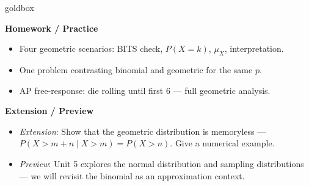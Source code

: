\documentclass[10pt]{article}
\begin{document}
\begin{skillbox}{goldbox}
\begin{minipage}[t]{0.48\linewidth}
    \textbf{Homework / Practice}
    \begin{itemize}
        \item Four geometric scenarios: BITS check, $P(X = k)$, $\mu_X$,
              interpretation.
        \item One problem contrasting binomial and geometric for the same $p$.
        \item AP free-response: die rolling until first 6 --- full geometric
              analysis.
    \end{itemize}
\end{minipage}
\hfill
\begin{minipage}[t]{0.48\linewidth}
    \textbf{Extension / Preview}
    \begin{itemize}
        \item \textit{Extension}: Show that the geometric distribution is
              memoryless --- $P(X > m+n \mid X > m) = P(X > n)$. Give a
              numerical example.
        \item \textit{Preview}: Unit 5 explores the normal distribution and
              sampling distributions --- we will revisit the binomial as an
              approximation context.
    \end{itemize}
\end{minipage}
\end{skillbox}
\end{document}
